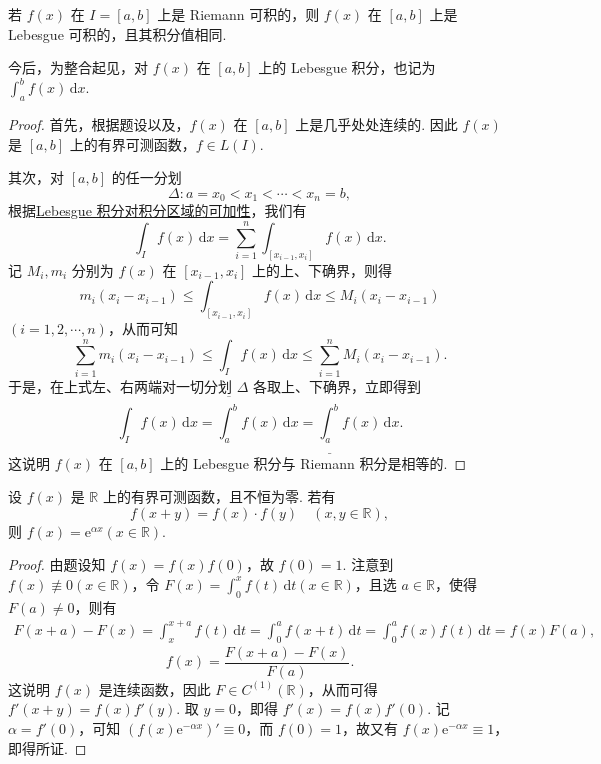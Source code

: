 \documentclass[../../main.tex]{subfiles}
\begin{document}
\begin{theorem}\label{theorem:定理4.25}
若 \( f(x) \) 在 \( I = [a,b] \) 上是 Riemann 可积的，则 \( f(x) \) 在 \( [a,b] \) 上是 Lebesgue 可积的，且其积分值相同.
\end{theorem}
\begin{remark}
今后，为整合起见，对 \( f(x) \) 在 \( [a,b] \) 上的 Lebesgue 积分，也记为$\int_a^b f(x) \, \mathrm{d}x.$
\end{remark}
\begin{proof}
首先，根据题设以及，\( f(x) \) 在 \( [a,b] \) 上是几乎处处连续的. 因此 \( f(x) \) 是 \( [a,b] \) 上的有界可测函数，\( f \in L(I) \).

其次，对 \( [a,b] \) 的任一分划
\[
\Delta: a = x_0 < x_1 < \cdots < x_n = b,
\]
根据\hyperref[theorem:积分对定义域的可数可加性]{Lebesgue 积分对积分区域的可加性}，我们有
\[
\int_I f(x) \, \mathrm{d}x = \sum_{i=1}^n \int_{[x_{i-1}, x_i]} f(x) \, \mathrm{d}x.
\]
记 \( M_i, m_i \) 分别为 \( f(x) \) 在 \( [x_{i-1}, x_i] \) 上的上、下确界，则得
\[
m_i (x_i - x_{i-1}) \leqslant  \int_{[x_{i-1}, x_i]} f(x) \, \mathrm{d}x \leqslant  M_i (x_i - x_{i-1})
\]
\( (i = 1,2,\cdots,n) \)，从而可知
\[
\sum_{i=1}^n m_i (x_i - x_{i-1}) \leqslant  \int_I f(x) \, \mathrm{d}x \leqslant  \sum_{i=1}^n M_i (x_i - x_{i-1}).
\]
于是，在上式左、右两端对一切分划 \( \Delta \) 各取上、下确界，立即得到
\[
\int_I f(x) \, \mathrm{d}x = \overline{\int_a^b} f(x) \, \mathrm{d}x = \underline{\int_a^b} f(x) \, \mathrm{d}x.
\]
这说明 \( f(x) \) 在 \( [a,b] \) 上的 Lebesgue 积分与 Riemann 积分是相等的.
\end{proof}

\begin{proposition}
设 \( f(x) \) 是 \( \mathbb{R} \) 上的有界可测函数，且不恒为零. 若有
\[
f(x + y) = f(x) \cdot f(y) \quad (x, y \in \mathbb{R}),
\]
则 \( f(x) = \mathrm{e}^{\alpha x} (x \in \mathbb{R}) \).
\end{proposition}
\begin{proof}
由题设知 \( f(x) = f(x)f(0) \)，故 \( f(0) = 1 \). 注意到 \( f(x) \not\equiv 0 (x \in \mathbb{R}) \)，令 \( F(x) = \int_0^x f(t) \, \mathrm{d}t (x \in \mathbb{R}) \)，且选 \( a \in \mathbb{R} \)，使得 \( F(a) \neq 0 \)，则有
\begin{align*}
F(x + a) - F(x) = \int_x^{x + a} f(t) \, \mathrm{d}t = \int_0^a f(x + t) \, \mathrm{d}t 
= \int_0^a f(x)f(t) \, \mathrm{d}t = f(x)F(a),
\end{align*}
\[
f(x) = \frac{F(x + a) - F(x)}{F(a)}.
\]
这说明 \( f(x) \) 是连续函数，因此 \( F \in C^{(1)}(\mathbb{R}) \)，从而可得 \( f'(x + y) = f(x)f'(y) \). 取 \( y = 0 \)，即得 \( f'(x) = f(x)f'(0) \). 记 \( \alpha = f'(0) \)，可知 \( (f(x)\mathrm{e}^{-\alpha x})' \equiv 0 \)，而 \( f(0) = 1 \)，故又有 \( f(x)\mathrm{e}^{-\alpha x} \equiv 1 \)，即得所证.
\end{proof}
\end{document}
